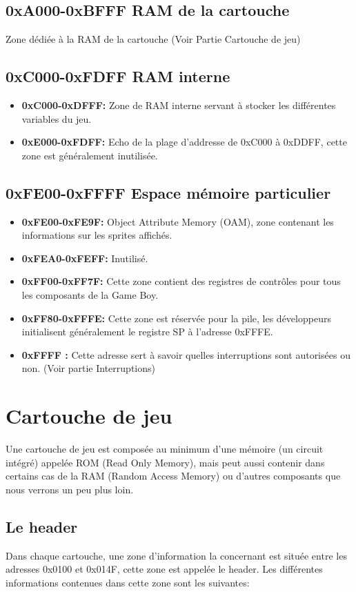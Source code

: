 \documentclass{report}
\begin{document}
\subsection{0xA000-0xBFFF RAM de la cartouche}
Zone dédiée à la RAM de la cartouche (Voir Partie Cartouche de jeu)

\subsection{0xC000-0xFDFF RAM interne}
\begin{itemize}
\item \textbf{0xC000-0xDFFF:} Zone de RAM interne servant à stocker les différentes variables du jeu.
\item \textbf{0xE000-0xFDFF:} Echo de la plage d'addresse de 0xC000 à 0xDDFF, cette zone est
généralement inutilisée.
\end{itemize} 

\subsection{0xFE00-0xFFFF Espace mémoire particulier}

\begin{itemize}
\item \textbf{0xFE00-0xFE9F:} Object Attribute Memory (OAM), zone contenant les informations
sur les sprites affichés.
\item \textbf{0xFEA0-0xFEFF:} Inutilisé.
\item \textbf{0xFF00-0xFF7F:} Cette zone contient des registres de contrôles pour tous les composants de la
Game Boy.
\item \textbf{0xFF80-0xFFFE:} Cette zone est réservée pour la pile, les
développeurs initialisent généralement le registre SP à l'adresse 0xFFFE.
\item \textbf{0xFFFF :} Cette adresse sert à savoir quelles interruptions sont autorisées ou
non. (Voir partie Interruptions)
\end{itemize} 

\section{Cartouche de jeu}
Une cartouche de jeu est composée au minimum d'une mémoire (un circuit intégré) appelée ROM (Read Only Memory), mais peut aussi contenir dans certains cas de la RAM (Random Access Memory) ou d'autres composants que nous verrons un peu plus loin.

\subsection{Le header}
Dans chaque cartouche, une zone d'information la concernant est située entre les adresses 0x0100 et 0x014F, cette zone est appelée le header. Les différentes informations contenues dans cette zone sont les suivantes:\\
\end{document}
